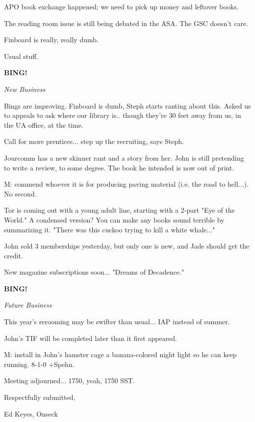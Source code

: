 \documentclass[12pt]{article}
\newcommand{\bing}{{\bf BING!} }
\newcommand{\goto}[1]{\bing \vskip 12pt \centerline{{\em{#1}}}}
\begin{document}
APO book exchange happened; we need to pick up money and leftover books.

The reading room issue is still being debated in the ASA. The GSC doesn't care.

Finboard is really, really dumb.

Usual stuff.

\goto{New Business}

Bings are improving. Finboard is dumb, Steph starts ranting about this. Asked us to appeals to ask where our library is.. though they're 30 feet away from us, in the UA office, at the time.

Call for more prentices... step up the recruiting, says Steph.

Jourcomm has a new skinner rant and a story from her. John is still pretending to write a review, to some degree. The book he intended is now out of print.

M: commend whoever it is for producing paving material (i.e. the road to hell...). No second.

Tor is coming out with a young adult line, starting with a 2-part "Eye of the World." A condensed version? You can make any books sound terrible by summarizing it. "There was this cuckoo trying to kill a white whale..."

John sold 3 memberships yesterday, but only one is new, and Jade should get the credit.

New magazine subscriptions soon... "Dreams of Decadence."

\goto{Future Business}

This year's rerooming may be swifter than usual... IAP instead of summer.

John's TIF will be completed later than it first appeared.

M: install in John's hamster cage a banana-colored night light so he can keep running. 8-1-0 +Spehn.

\vspace{12pt}

\noindent
Meeting adjourned... 1750, yeah, 1750 SST.

\vspace{18pt}

\centerline{Respectfully submitted,}
\centerline{Ed Keyes, Onseck}
\end{document}
